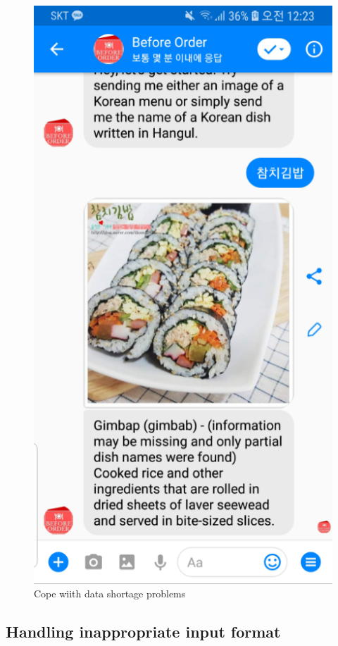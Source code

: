 \begin{figure}[htbp]
\centerline{\includegraphics[height=\custompicheight]{./pictures/facebook_additional_feature}}
\caption{Cope wiith data shortage problems}
\label{fig:Before Order_features}
\end{figure}
\FloatBarrier

\subsection{Handling inappropriate input format}

